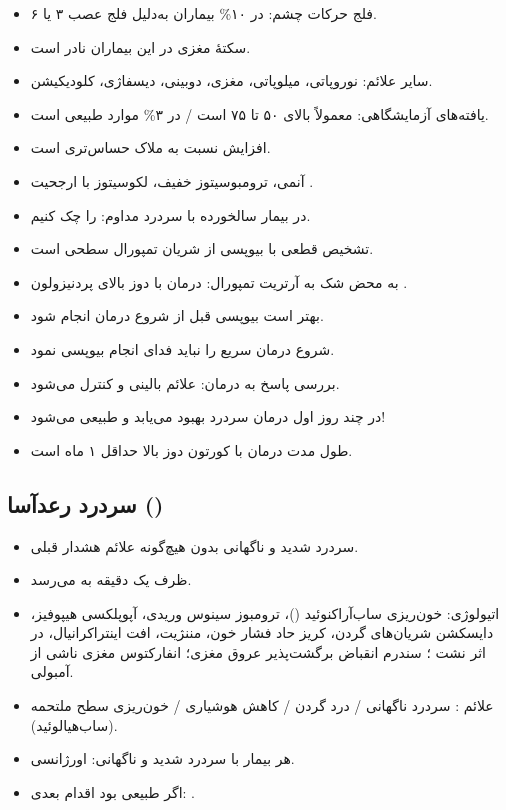 \begin{itemize}
\item فلج حرکات چشم: در ۱۰\% بیماران به‌دلیل فلج عصب ۳ یا ۶.
\item سکتهٔ مغزی در این بیماران نادر است.
\item سایر علائم: نوروپاتی، میلوپاتی،  مغزی، دوبینی، دیسفاژی، کلودیکیشن.
\item یافته‌های آزمایشگاهی:  معمولاً بالای ۵۰ تا ۷۵ است / در ۳\% موارد طبیعی است.
\item افزایش  نسبت به  ملاک حساس‌تری است.
\item آنمی، ترومبوسیتوز خفیف، لکوسیتوز با ارجحیت .
\item در بیمار سالخورده با سردرد مداوم:  را چک کنیم.
\item تشخیص قطعی با بیوپسی از شریان تمپورال سطحی است.
\item به محض شک به آرتریت تمپورال: درمان با دوز بالای پردنیزولون .
\item بهتر است بیوپسی قبل از شروع درمان انجام شود.
\item شروع درمان سریع را نباید فدای انجام بیوپسی نمود.
\item بررسی پاسخ به درمان: علائم بالینی و  کنترل می‌شود.
\item در چند روز اول درمان سردرد بهبود می‌یابد و  طبیعی می‌شود!
\item طول مدت درمان با کورتون دوز بالا حداقل ۱ ماه است.
\end{itemize}
\subsection{سردرد رعدآسا ()}
\begin{itemize}
\item سردرد شدید و ناگهانی بدون هیچ‌گونه علائم هشدار قبلی.
\item ظرف یک دقیقه به  می‌رسد.
\item اتیولوژی: خون‌ریزی ساب‌آراکنوئید ()، ترومبوز سینوس وریدی، آپوپلکسی هیپوفیز، دایسکشن شریان‌های گردن، کریز حاد فشار خون، مننژیت، افت  اینتراکرانیال، در اثر نشت ؛ سندرم انقباض برگشت‌پذیر عروق مغزی؛ انفارکتوس مغزی ناشی از آمبولی.
\end{itemize}

\begin{itemize}
\item علائم : سردرد ناگهانی / درد گردن / کاهش هوشیاری / خون‌ریزی سطح ملتحمه (ساب‌هیالوئید).
\item هر بیمار با سردرد شدید و ناگهانی:  اورژانسی.
\item اگر  طبیعی بود اقدام بعدی: .
\end{itemize}
